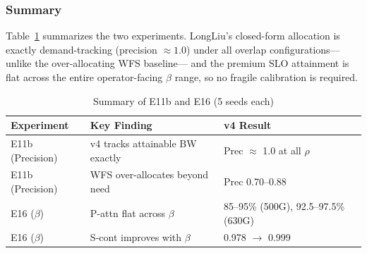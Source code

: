 \subsubsection{Summary}

Table~\ref{tab:e11b_e16_summary} summarizes the two experiments. LongLiu's
closed-form allocation is exactly demand-tracking (precision $\approx 1.0$)
under all overlap configurations---unlike the over-allocating WFS baseline---
and the premium SLO attainment is flat across the entire operator-facing
$\beta$ range, so no fragile calibration is required.

\begin{table}[t]
\centering
\caption{Summary of E11b and E16 (5 seeds each)}
\label{tab:e11b_e16_summary}
\begin{tabular}{lll}
\toprule
\textbf{Experiment} & \textbf{Key Finding} & \textbf{v4 Result} \\
\midrule
E11b (Precision) & v4 tracks attainable BW exactly & Prec $\approx$ 1.0 at all $\rho$ \\
E11b (Precision) & WFS over-allocates beyond need & Prec 0.70--0.88 \\
E16 ($\beta$) & P-attn flat across $\beta$ & 85--95\% (500G), 92.5--97.5\% (630G) \\
E16 ($\beta$) & S-cont improves with $\beta$ & 0.978 $\rightarrow$ 0.999 \\
\bottomrule
\end{tabular}
\end{table}
